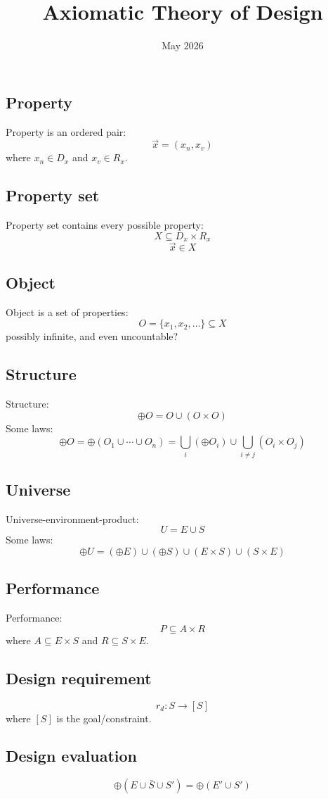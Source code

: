 \documentclass{article}
\title{Axiomatic Theory of Design}
\date{May 2026}
\begin{document}
\maketitle

\subsection{Property}
Property is an ordered pair:
$$\vec{x} = (x_n, x_v)$$
where $x_n \in D_x$ and $x_v \in R_x$.

\subsection{Property set}
Property set contains every possible property:
$$X \subseteq D_x \times R_x$$
$$\vec{x} \in X$$

\subsection{Object}
Object is a set of properties:
$$O = \{ x_1, x_2, \ldots \} \subseteq X$$
possibly infinite, and even uncountable?

\subsection{Structure}
Structure:
$$\oplus O = O \cup (O \times O)$$
Some laws:
$$\oplus O = \oplus (O_1 \cup \cdots \cup O_n) = \bigcup_i (\oplus O_i) \cup \bigcup_{i \neq j} (O_i \times O_j)$$

\subsection{Universe}
Universe-environment-product:
$$U = E \cup S$$
Some laws:
$$\oplus U = (\oplus E) \cup (\oplus S) \cup (E \times S) \cup (S \times E)$$

\subsection{Performance}
Performance:
$$P \subseteq A \times R$$
where $A \subseteq E \times S$ and $R \subseteq S \times E$.

\subsection{Design requirement}
$$r_d : S \rightarrow [S]$$
where $[S]$ is the goal/constraint.

\subsection{Design evaluation}
$$\oplus (E \cup \bar{S} \cup S') = \oplus (E' \cup S')$$
\end{document}
